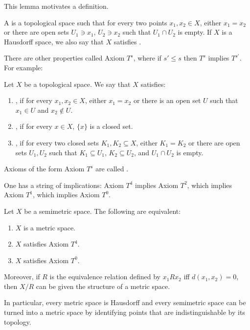 This lemma motivates a definition.

\begin{definition}
A  is a topological space such that for every two points $x_1, x_2 \in X$, either $x_1 = x_2$ or there are open sets $U_1 \ni x_1$, $U_2 \ni x_2$ such that $U_1 \cap U_2$ is empty.
If $X$ is a Hausdorff space, we also say that $X$ satisfies .
\end{definition}

There are other properties called Axiom $T^s$, where if $s' \leq s$ then $T^s$ implies $T^{s'}$. For example:

\begin{definition}
Let $X$ be a topological space. We say that $X$ satisfies:
\begin{enumerate}
\item {}, if for every $x_1, x_2 \in X$, either $x_1 = x_2$ or there is an open set $U$ such that $x_1 \in U$ and $x_2 \notin U$.
\item {}, if for every $x \in X$, $\{x\}$ is a closed set.
\item {}, if for every two closed sets $K_1, K_2 \subseteq X$, either $K_1 = K_2$ or there are open sets $U_1, U_2$ such that $K_1 \subseteq U_1$, $K_2 \subseteq U_2$, and $U_1 \cap U_2$ is empty.
\end{enumerate}
Axioms of the form Axiom $T^s$ are called .
\end{definition}

\begin{lemma}
One has a string of implications: Axiom $T^4$ implies Axiom $T^2$, which implies Axiom $T^1$, which implies Axiom $T^0$.
\end{lemma}

\begin{lemma}
Let $X$ be a semimetric space. The following are equivalent:
\begin{enumerate}
\item $X$ is a metric space.
\item $X$ satisfies Axiom $T^4$.
\item $X$ satisfies Axiom $T^0$.
\end{enumerate}
Moreover, if $R$ is the equivalence relation defined by $x_1 R x_2$ iff $d(x_1, x_2) = 0$, then $X/R$ can be given the structure of a metric space.
\end{lemma}

In particular, every metric space is Hausdorff and every semimetric space can be turned into a metric space by identifying points that are indistinguishable by its topology.

